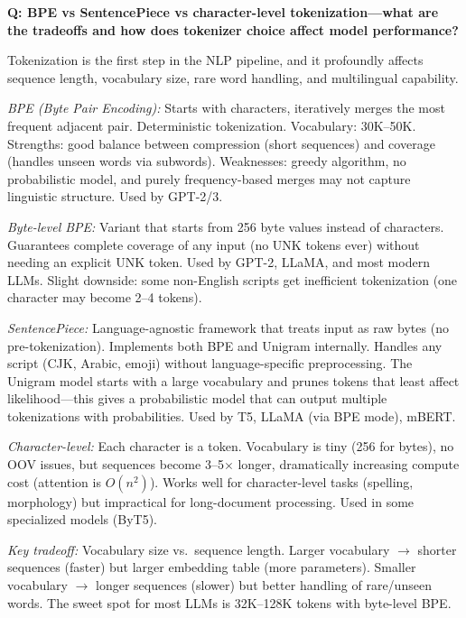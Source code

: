 \begin{interviewq}
\textbf{Q: BPE vs SentencePiece vs character-level tokenization---what are the tradeoffs and how does tokenizer choice affect model performance?}

 \quad {} \quad \badgefreq{\freqmed}

\stronganswer Tokenization is the first step in the NLP pipeline, and it profoundly affects sequence length, vocabulary size, rare word handling, and multilingual capability.

\textit{BPE (Byte Pair Encoding):} Starts with characters, iteratively merges the most frequent adjacent pair. Deterministic tokenization. Vocabulary: 30K--50K. Strengths: good balance between compression (short sequences) and coverage (handles unseen words via subwords). Weaknesses: greedy algorithm, no probabilistic model, and purely frequency-based merges may not capture linguistic structure. Used by GPT-2/3.

\textit{Byte-level BPE:} Variant that starts from 256 byte values instead of characters. Guarantees complete coverage of any input (no UNK tokens ever) without needing an explicit UNK token. Used by GPT-2, LLaMA, and most modern LLMs. Slight downside: some non-English scripts get inefficient tokenization (one character may become 2--4 tokens).

\textit{SentencePiece:} Language-agnostic framework that treats input as raw bytes (no pre-tokenization). Implements both BPE and Unigram internally. Handles any script (CJK, Arabic, emoji) without language-specific preprocessing. The Unigram model starts with a large vocabulary and prunes tokens that least affect likelihood---this gives a probabilistic model that can output multiple tokenizations with probabilities. Used by T5, LLaMA (via BPE mode), mBERT.

\textit{Character-level:} Each character is a token. Vocabulary is tiny (256 for bytes), no OOV issues, but sequences become 3--5$\times$ longer, dramatically increasing compute cost (attention is $O(n^2)$). Works well for character-level tasks (spelling, morphology) but impractical for long-document processing. Used in some specialized models (ByT5).

\textit{Key tradeoff:} Vocabulary size vs.\ sequence length. Larger vocabulary $\to$ shorter sequences (faster) but larger embedding table (more parameters). Smaller vocabulary $\to$ longer sequences (slower) but better handling of rare/unseen words. The sweet spot for most LLMs is 32K--128K tokens with byte-level BPE.


\end{interviewq}
